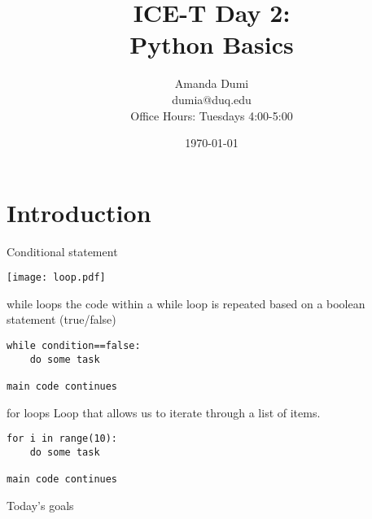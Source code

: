 \documentclass[xcolor=x11names,compress]{beamer}
\title[{\makebox[.5\paperwidth]{\hfill
       \insertframenumber/\inserttotalframenumber}}]{ICE-T Day 2:\\
Python Basics}
\author[\quad Amanda \quad\quad\quad\quad aed63@pitt.edu]{Amanda Dumi\\
dumia@duq.edu\\
Office Hours:
Tuesdays 4:00-5:00\\
}
\date{\small{\today}}
\renewcommand{\(}{\begin{columns}}
\renewcommand{\)}{\end{columns}}
\newcommand{\<}[1]{\begin{column}{#1}}
\renewcommand{\>}{\end{column}}
\begin{document}
\section{Introduction}
\begin{frame}
\titlepage
\end{frame}
\begin{frame}{Conditional statement}
    \begin{center}
        \texttt{[image: loop.pdf]}
    \end{center}
\end{frame}
\begin{frame}[fragile]{while loops}
the code within a while loop is repeated based on a boolean statement (true/false)
\begin{verbatim}
while condition==false:
    do some task

main code continues
\end{verbatim}
\end{frame}
\begin{frame}[fragile]{for loops}
Loop that allows us to iterate through a list of items.
\begin{verbatim}
for i in range(10):
    do some task

main code continues
\end{verbatim}
\end{frame}
\begin{frame}{Today's goals}

\end{frame}
\end{document}
